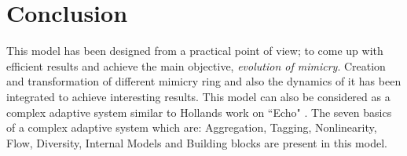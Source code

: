 \section{Conclusion}
This model has been designed from a practical point of view; to come up with efficient results and achieve the main objective, \textit{evolution of mimicry}. Creation and transformation of different mimicry ring and also the dynamics of it has been integrated to achieve interesting results. This model can also be considered as a complex adaptive system similar to Hollands work on ``Echo" \cite{holland1996}. The seven basics of a complex adaptive system which are: Aggregation, Tagging, Nonlinearity, Flow, Diversity, Internal Models and Building blocks are present in this model.